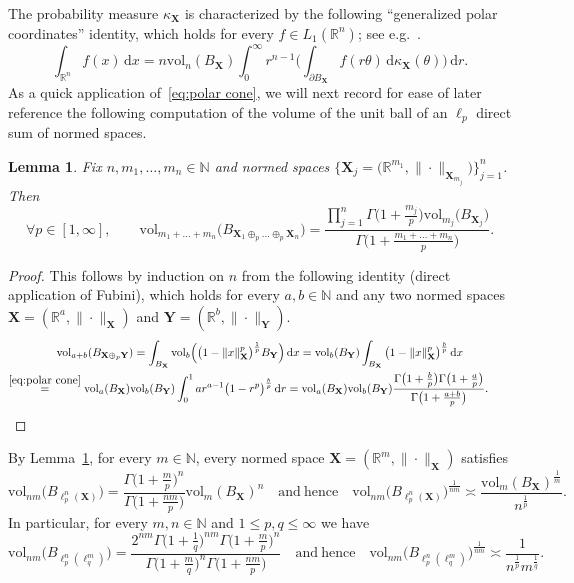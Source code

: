 \documentclass[11pt,reqno]{amsart}
\renewcommand{\le}{\leqslant}
\newcommand{\ud}[0]{\,\mathrm{d}}
\newcommand{\X}{\mathbf X}
\newcommand{\Y}{\mathbf Y}
\newcommand{\R}{\mathbb R}
\newtheorem{lemma}[theorem]{Lemma}
\theoremstyle{remark}
\newcommand{\N}{\mathbb N}
\newcommand{\vol}{\mathrm{vol}}
\renewcommand{\1}{\mathbf 1}
\begin{document}
The probability measure $\kappa_{\X}$ is characterized by the following ``generalized polar coordinates'' identity, which holds for every $f\in L_1(\R^n)$; see e.g.~\cite[Proposition~1]{NR03}.
\begin{equation}\label{eq:polar cone}
\int_{\R^n} f(x)\ud x=n\vol_n(B_{\X})\int_0^\infty r^{n-1}\bigg(\int_{\partial B_{\X}} f(r\theta)\ud\kappa_{\X}(\theta)\bigg)\ud r.
\end{equation}
As a quick application of~\eqref{eq:polar cone}, we will next record for ease of later reference the following computation of the volume of the unit ball of an $\ell_p$ direct sum of normed spaces.
\begin{lemma}\label{lem:volume of lp direct sum}Fix  $n,m_1,\ldots,m_n\in \N$ and normed spaces $\big\{\X_j=\big(\R^{m_1},\|\cdot\|_{\X_{m_j}}\big)\big\}_{j=1}^n$. Then
\begin{equation}\label{eq:volume formula for direct sum}
\forall p\in [1,\infty],\qquad \vol_{m_1+\ldots+m_n} \big(B_{\X_1\oplus_p\ldots\oplus_p\X_n}\big)=\frac{\prod_{j=1}^n\Gamma\big(1+\frac{m_j}{p}\big)\vol_{m_j}\big(B_{\X_j}\big)}{\Gamma\big(1+\frac{m_1+\ldots+m_n}{p}\big)}.
\end{equation}
\end{lemma}
\begin{proof} This follows by induction on $n$ from the following identity (direct application of Fubini), which holds for every $a,b\in \N$ and any two normed spaces $\X=(\R^a,\|\cdot\|_{\X})$ and $\Y=(\R^b,\|\cdot\|_{\Y})$.
\begin{multline*}
\vol_{a+b}(B_{\X\oplus_p \Y})=\int_{B_{\X}} \vol_b\Big( \big(1-\|x\|_{\X}^p\big)^{\frac{1}{p}}B_{\Y}\Big)\ud x=\vol_b(B_{\Y})\int_{B_{\X}} \big(1-\|x\|_{\X}^p\big)^{\frac{b}{p}}\ud x\\\stackrel{\eqref{eq:polar cone}}{=}\vol_a(B_{\X})\vol_b(B_{\Y})\int_0^1 ar^{a-1}\big(1-r^p\big)^{\frac{b}{p}}\ud r
=\vol_a(B_{\X})\vol_b(B_{\Y})\frac{\Gamma\big(1+\frac{b}{p}\big)\Gamma\big(1+\frac{a}{p}\big)}{\Gamma\big(1+\frac{a+b}{p}\big)}.\tag*{\qedhere}
\end{multline*}
\end{proof}
By Lemma~\ref{lem:volume of lp direct sum}, for every $m\in \N$, every normed space $\X=(\R^m,\|\cdot\|_{\X})$ satisfies
\begin{equation}\label{eq:ell p X}
\vol_{nm}\big(B_{\ell_p^n(\X)}\big)=\frac{\Gamma\big(1+\frac{m}{p}\big)^n}{\Gamma\big(1+\frac{nm}{p}\big)}\vol_m(B_{\X})^n\quad\mathrm{and\ hence}\quad  \vol_{nm}\big(B_{\ell_p^n(\X)}\big)^{\frac{1}{nm}}\asymp \frac{\vol_{m}(B_{\X})^{\frac{1}{m}}}{n^{\frac{1}{p}}}.
\end{equation}
In particular, for every $m,n\in \N$ and $1\le p,q\le \infty$ we have
\begin{equation}\label{eq:volume of ellp ellq}
\vol_{nm}\big(B_{\ell_p^n(\ell_q^m)}\big)= \frac{2^{nm}\Gamma\big(1+\frac{1}{q}\big)^{nm}\Gamma\big(1+\frac{m}{p}\big)^n}{\Gamma\big(1+\frac{m}{q}\big)^n\Gamma\big(1+\frac{nm}{p}\big)}\quad\mathrm{and\ hence}\quad \vol_{nm}\big(B_{\ell_p^n(\ell_q^m)}\big)^{\frac{1}{nm}}\asymp \frac{1}{n^{\frac{1}{p}}m^{\frac{1}{q}}}.
\end{equation}
\end{document}
